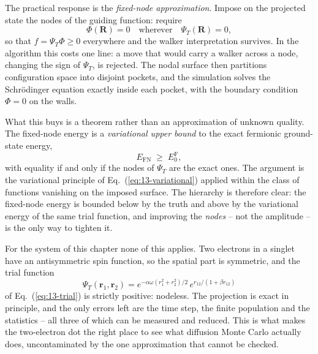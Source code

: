The practical response is the \emph{fixed-node approximation}.  Impose on the
projected state the nodes of the guiding function: require
\begin{equation}
  \Phi(\bm{R}) = 0 \quad\text{wherever}\quad \Psi_T(\bm{R}) = 0 ,
  \label{eq:15-fixednode}
\end{equation}
so that $f=\Psi_T\Phi\ge0$ everywhere and the walker interpretation survives.
In the algorithm this costs one line: a move that would carry a walker across
a node, changing the sign of $\Psi_T$, is rejected.  The nodal surface then
partitions configuration space into disjoint pockets, and the simulation
solves the Schr\"odinger equation exactly inside each pocket, with the
boundary condition $\Phi=0$ on the walls.

What this buys is a theorem rather than an approximation of unknown quality.
The fixed-node energy is a \emph{variational upper bound} to the exact
fermionic ground-state energy,
\begin{equation}
  E_{\mathrm{FN}} \;\ge\; E_0^{\mathrm{F}},
  \label{eq:15-fixednodebound}
\end{equation}
with equality if and only if the nodes of $\Psi_T$ are the exact ones.  The
argument is the variational principle of Eq.~(\ref{eq:13-variational}) applied
within the class of functions vanishing on the imposed surface.  The hierarchy
is therefore clear: the fixed-node energy is bounded below by the truth and
above by the variational energy of the same trial function, and improving the
\emph{nodes} -- not the amplitude -- is the only way to tighten it.

\begin{svgraybox}
For the system of this chapter none of this applies.  Two electrons in a
singlet have an antisymmetric spin function, so the spatial part is symmetric,
and the trial function
\begin{equation*}
  \Psi_T(\bm{r}_1,\bm{r}_2)
   = e^{-\alpha\omega(r_1^2+r_2^2)/2}\,
     e^{r_{12}/(1+\beta r_{12})}
\end{equation*}
of Eq.~(\ref{eq:13-trial}) is strictly positive: nodeless.  The projection is
exact in principle, and the only errors left are the time step, the finite
population and the statistics -- all three of which can be measured and
reduced.  This is what makes the two-electron dot the right place to see what
diffusion Monte Carlo actually does, uncontaminated by the one approximation
that cannot be checked.
\end{svgraybox}

